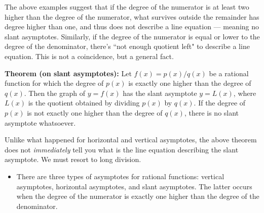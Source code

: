 \documentclass{ximera}
\begin{document}
The above examples suggest that if the degree of the numerator is at least two higher than the degree of the numerator, what survives outside the remainder has degree higher than one, and thus does not describe a line equation --- meaning no slant asymptotes. Similarly, if the degree of the numerator is equal or lower to the degree of the denominator, there's ``not enough quotient left" to describe a line equation. This is not a coincidence, but a general fact.

\begin{callout}
  {\bf Theorem (on slant asymptotes):} Let $f(x) = p(x)/q(x)$ be a rational function for which the degree of $p(x)$ is exactly one higher than the degree of $q(x)$. Then the graph of $y=f(x)$ has the slant asymptote $y=L(x)$, where $L(x)$ is the quotient obtained by dividing $p(x)$ by $q(x)$. If the degree of $p(x)$ is not exactly one higher than the degree of $q(x)$, there is no slant asymptote whatsoever.
\end{callout}

  Unlike what happened for horizontal and vertical asymptotes, the above theorem does not \emph{immediately} tell you what is the line equation describing the slant asymptote. We must resort to long division.


\begin{summary}\begin{itemize}
\item There are three types of asymptotes for rational functions: vertical asymptotes, horizontal asymptotes, and slant asymptotes. The latter occurs when the degree of the numerator is exactly one higher than the degree of the denominator.
\end{itemize}\end{summary}
\end{document}
